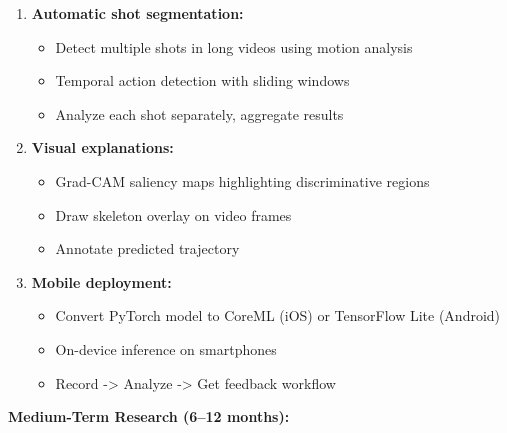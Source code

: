 \documentclass[11pt,a4paper]{article}
\begin{document}
\begin{enumerate}
\item \textbf{Automatic shot segmentation:}
   \begin{itemize}
   \item Detect multiple shots in long videos using motion analysis
   \item Temporal action detection with sliding windows
   \item Analyze each shot separately, aggregate results
   \end{itemize}

\item \textbf{Visual explanations:}
   \begin{itemize}
   \item Grad-CAM saliency maps highlighting discriminative regions
   \item Draw skeleton overlay on video frames
   \item Annotate predicted trajectory
   \end{itemize}

\item \textbf{Mobile deployment:}
   \begin{itemize}
   \item Convert PyTorch model to CoreML (iOS) or TensorFlow Lite (Android)
   \item On-device inference on smartphones
   \item Record -> Analyze -> Get feedback workflow
   \end{itemize}
\end{enumerate}

\textbf{Medium-Term Research (6--12 months):}
\end{document}
